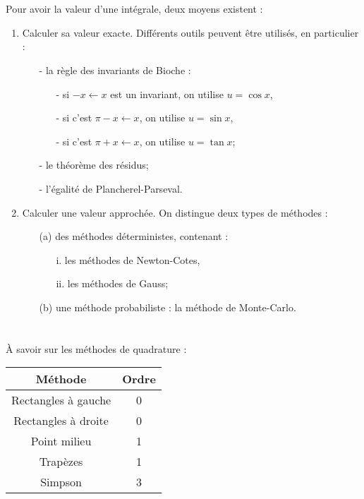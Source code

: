 \documentclass[conference]{IEEEtran}
\begin{document}
\section{}
\noindent
Pour avoir la valeur d'une intégrale, deux moyens existent :
\begin{enumerate}
    \item Calculer sa valeur exacte. Différents outils peuvent être utilisés, en particulier :
    \begin{itemize}
        \item[-] la règle des invariants de Bioche :
        \begin{itemize}
            \item[-] si $-x\leftarrow x$ est un invariant, on utilise $u = \cos x$,
            \item[-] si c'est $\pi-x\leftarrow x$, on utilise $u=\sin x$,
            \item[-] si c'est $\pi+x\leftarrow x$, on utilise $u=\tan x$;
        \end{itemize}
        \item[-] le théorème des résidus;
        \item[-] l'égalité de Plancherel-Parseval.
    \end{itemize}
    \item Calculer une valeur approchée. On distingue deux types de méthodes :
    \begin{itemize}
        \item[(a)] des méthodes déterministes, contenant :
        \begin{itemize}
            \item[i.] les méthodes de Newton-Cotes,
            \item[ii.] les méthodes de Gauss;
        \end{itemize}
        \item[(b)] une méthode probabiliste : la méthode de Monte-Carlo. 
    \end{itemize}
\end{enumerate}

\section{}
\noindent
À savoir sur les méthodes de quadrature :
\newline
\newline
\begin{tabular}{|c|c|}
    \hline
    Méthode & Ordre \\
    \hline
    \hline
    Rectangles à gauche & 0 \\
    Rectangles à droite & 0 \\
    Point milieu & 1 \\
    \hline
    Trapèzes & 1 \\
    \hline
    Simpson & 3 \\
    \hline
\end{tabular}
\end{document}

